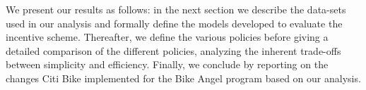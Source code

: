 We present our results as follows: in the next section we describe the data-sets used in our analysis and formally define the models developed to evaluate the incentive scheme. Thereafter, we define the various policies before giving a detailed comparison of the different policies, analyzing the inherent trade-offs between simplicity and efficiency. Finally, we conclude by reporting on the changes Citi Bike implemented for the Bike Angel program based on our analysis.











